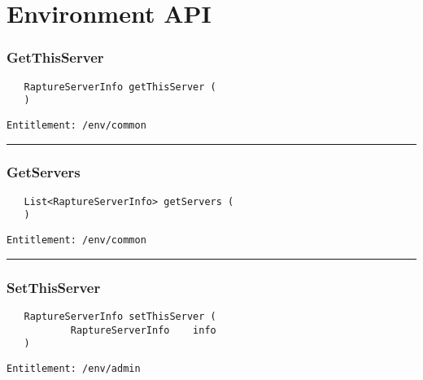 \chapter{Environment API}

\subsection{GetThisServer}
\label{Api:GetThisServer}
\begin{verbatim}
   RaptureServerInfo getThisServer (
   )
\end{verbatim}
\begin{Verbatim}[fontsize=\small, formatcom=\color{Maroon}]
  Entitlement: /env/common
\end{Verbatim}



\rule{12cm}{2pt}
\subsection{GetServers}
\label{Api:GetServers}
\begin{verbatim}
   List<RaptureServerInfo> getServers (
   )
\end{verbatim}
\begin{Verbatim}[fontsize=\small, formatcom=\color{Maroon}]
  Entitlement: /env/common
\end{Verbatim}



\rule{12cm}{2pt}
\subsection{SetThisServer}
\label{Api:SetThisServer}
\begin{verbatim}
   RaptureServerInfo setThisServer (
           RaptureServerInfo    info
   )
\end{verbatim}
\begin{Verbatim}[fontsize=\small, formatcom=\color{Maroon}]
  Entitlement: /env/admin
\end{Verbatim}



